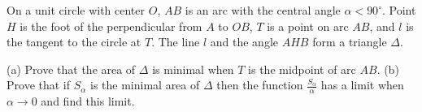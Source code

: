 On a unit circle with center $O$, $AB$ is an arc with the central angle $\alpha<90^\circ$. Point $H$ is the foot of the perpendicular from $A$ to $OB$, $T$ is a point on arc $AB$, and $l$ is the tangent to the circle at $T$. The line $l$ and the angle $AHB$ form a triangle $\Delta$.

(a) Prove that the area of $\Delta$ is minimal when $T$ is the midpoint of arc $AB$.
(b) Prove that if $S_\alpha$ is the minimal area of $\Delta$ then the function $\frac{S_\alpha}\alpha$ has a limit when $\alpha\to0$ and find this limit.